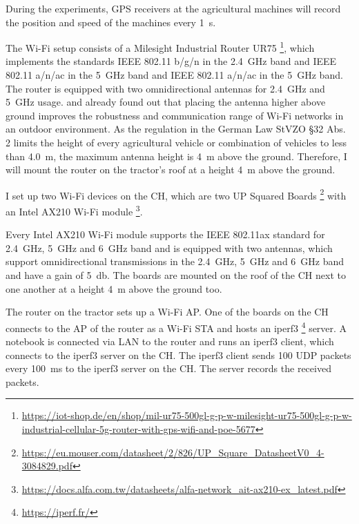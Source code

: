 During the experiments, \ac{GPS} receivers at the agricultural machines will record the position and speed of the machines every \SI{1}{\second}.

The Wi-Fi setup consists of a Milesight Industrial Router UR75 \footnote{\url{https://iot-shop.de/en/shop/mil-ur75-500gl-g-p-w-milesight-ur75-500gl-g-p-w-industrial-cellular-5g-router-with-gps-wifi-and-poe-5677}}, which implements the standards IEEE 802.11 b/g/n in the \SI{2.4}{\giga\hertz} band and IEEE 802.11 a/n/ac in the \SI{5}{\giga\hertz} band and
IEEE 802.11 a/n/ac in the \SI{5}{\giga\hertz} band.
The router is equipped with two omnidirectional antennas for  \SI{2.4}{\giga\hertz} and \SI{5}{\giga\hertz} usage.
\textcite{brinkhoff_characterization_2017} and \textcite{paul_characterizing_2011}  already found out that placing the antenna higher above ground improves
the robustness and communication range of Wi-Fi networks in an outdoor environment.
As the regulation in the German Law StVZO §32 Abs. 2 limits the height of
every agricultural vehicle or combination of vehicles to less than \SI{4.0}{\metre}, the maximum antenna height is \SI{4}{\metre} above the ground. Therefore, I will mount the router on the tractor's roof at a height \SI{4}{\metre} above the ground.


I set up two Wi-Fi devices on the \ac{CH}, which are two UP Squared Boards \footnote{\url{https://eu.mouser.com/datasheet/2/826/UP_Square_DatasheetV0_4-3084829.pdf}} with an Intel AX210 Wi-Fi module \footnote{\url{https://docs.alfa.com.tw/datasheets/alfa-network_ait-ax210-ex_latest.pdf}}.

Every Intel AX210 Wi-Fi module supports the IEEE 802.11ax standard for \SI{2.4}{\giga\hertz}, \SI{5}{\giga\hertz} and \SI{6}{\giga\hertz} band and is equipped with two antennas,
which support omnidirectional transmissions in the \SI{2.4}{\giga\hertz}, \SI{5}{\giga\hertz} and \SI{6}{\giga\hertz} band and have a gain of \SI{5}{\decibel}.
The boards are mounted on the roof of the \ac{CH} next to one another at a height \SI{4}{\metre} above the ground too.

The router on the tractor sets up a Wi-Fi \ac{AP}.
One of the boards on the \ac{CH} connects to the \ac{AP} of the router as a Wi-Fi \ac{STA} and hosts an iperf3 \footnote{\url{https://iperf.fr/}} server.
A notebook is connected via LAN to the router and runs an iperf3 client, which connects to the iperf3 server on the \ac{CH}.
The iperf3 client sends \SI{100}{\byte} \ac{UDP} packets every \SI{100}{\milli\second} to the iperf3 server on the \ac{CH}.
The server records the received packets.

